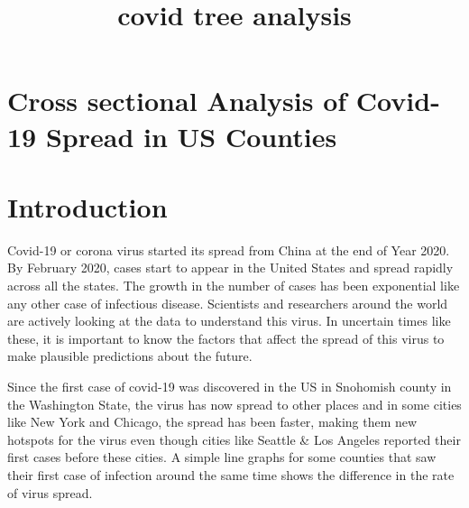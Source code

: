 \documentclass[
]{article}
\title{covid tree analysis}
\author{}
\date{\vspace{-2.5em}}
\begin{document}
\maketitle

\hypertarget{cross-sectional-analysis-of-covid-19-spread-in-us-counties}{%
\section{Cross sectional Analysis of Covid-19 Spread in US
Counties}\label{cross-sectional-analysis-of-covid-19-spread-in-us-counties}}

\hypertarget{introduction}{%
\section{Introduction}\label{introduction}}

Covid-19 or corona virus started its spread from China at the end of
Year 2020. By February 2020, cases start to appear in the United States
and spread rapidly across all the states. The growth in the number of
cases has been exponential like any other case of infectious disease.
Scientists and researchers around the world are actively looking at the
data to understand this virus. In uncertain times like these, it is
important to know the factors that affect the spread of this virus to
make plausible predictions about the future.

Since the first case of covid-19 was discovered in the US in Snohomish
county in the Washington State, the virus has now spread to other places
and in some cities like New York and Chicago, the spread has been
faster, making them new hotspots for the virus even though cities like
Seattle \& Los Angeles reported their first cases before these cities. A
simple line graphs for some counties that saw their first case of
infection around the same time shows the difference in the rate of virus
spread.
\end{document}
